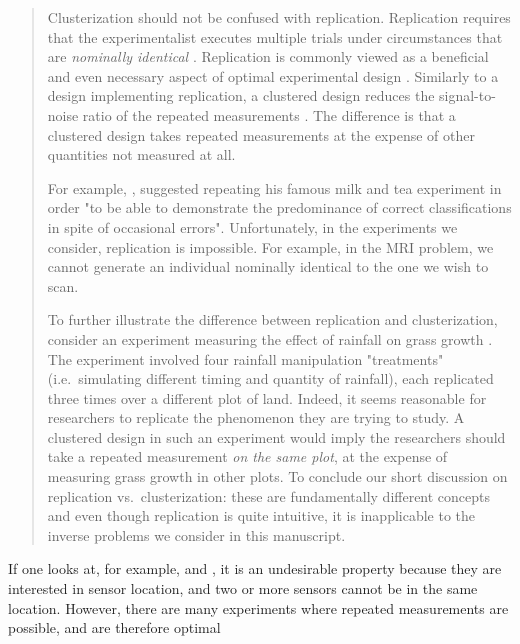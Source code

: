 \begin{quote}
  Clusterization should not be confused with replication. Replication
  requires that the experimentalist executes multiple trials under
  circumstances that are \emph{nominally identical} \cite[Section
    1.2.4]{morris2011}. Replication is commonly viewed as a beneficial
  and even necessary aspect of optimal experimental design
  \cite{fisher1949design, morris2011,
    schafer2001replication}. Similarly to a design implementing
  replication, a clustered design reduces the signal-to-noise ratio of
  the repeated measurements \cite{telford2007brief}. The difference is
  that a clustered design takes repeated measurements at the expense
  of other quantities not measured at all.

  For example, \cite{fisher1949design}, suggested repeating his famous
  milk and tea experiment in order "to be able to demonstrate the
  predominance of correct classifications in spite of occasional
  errors". Unfortunately, in the experiments we consider, replication
  is impossible. For example, in the MRI problem, we cannot generate
  an individual nominally identical to the one we wish to scan.

  To further illustrate the difference between replication and
  clusterization, consider an experiment measuring the effect of
  rainfall on grass growth \cite{fay2000rainfall}. The experiment
  involved four rainfall manipulation "treatments" (i.e.~simulating
  different timing and quantity of rainfall), each replicated three
  times over a different plot of land. Indeed, it seems reasonable for
  researchers to replicate the phenomenon they are trying to study. A
  clustered design in such an experiment would imply the researchers
  should take a repeated measurement \emph{on the same plot}, at the
  expense of measuring grass growth in other plots. To conclude our
  short discussion on replication vs.~clusterization: these are
  fundamentally different concepts and even though replication is
  quite intuitive, it is inapplicable to the inverse problems we
  consider in this manuscript.
\end{quote}



\RC If one looks at, for example, \cite{fedorov1996} and
\cite{nyberg2012}, it is an undesirable property because they are
interested in sensor location, and two or more sensors cannot be in
the same location. However, there are many experiments where repeated
measurements are possible, and are therefore optimal

